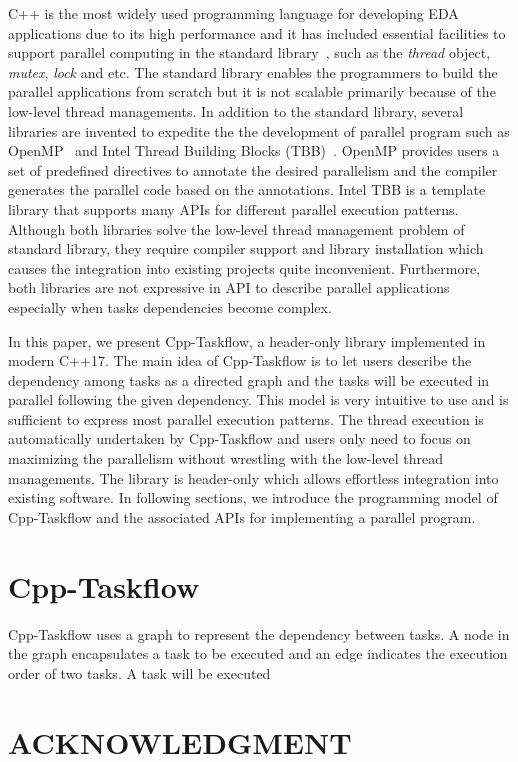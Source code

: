 \documentclass[sigconf]{acmart}
\begin{document}
C++ is the most widely used programming language for developing EDA
applications due to its high performance and it has included essential
facilities to support parallel computing in the standard library~\cite{cpp-thread}, such as the
\textit{thread} object, \textit{mutex}, \textit{lock} and etc.  The standard
library enables the programmers to build the parallel applications from scratch 
but it is not scalable primarily because of the low-level thread managements.
In addition to the standard library, several libraries are invented to expedite the
the development of parallel program such as OpenMP~\cite{openmp} and Intel
Thread Building Blocks (TBB)~\cite{tbb}.  OpenMP provides users a set of
predefined directives to annotate the desired parallelism and the compiler generates
the parallel code based on the annotations. Intel TBB is a template library that supports 
many APIs for different parallel execution patterns. Although both libraries 
solve the low-level thread management problem of standard library, they require
compiler support and library installation which causes the integration
into existing projects quite inconvenient. Furthermore, both libraries 
are not expressive in API to describe parallel applications especially
when tasks dependencies become complex.

In this paper, we present Cpp-Taskflow, a header-only library implemented in 
modern C++17. The main idea of Cpp-Taskflow is to let users describe the 
dependency among tasks as a directed graph and the tasks will be executed in
parallel following the given dependency. This model is very intuitive to use
and is sufficient to express most parallel execution patterns. 
The thread execution is automatically undertaken by Cpp-Taskflow and users only need to
focus on maximizing the parallelism without wrestling with the low-level thread
managements. The library is header-only which allows effortless integration
into existing software.  In following sections, we introduce the programming
model of Cpp-Taskflow and the associated APIs for implementing a parallel
program.


\section{Cpp-Taskflow}
Cpp-Taskflow uses a graph to represent the dependency between tasks. A node in the graph 
encapsulates a task to be executed and an edge indicates the execution order of two tasks.
A task will be executed 


\section{ACKNOWLEDGMENT}




%
%


\end{document}
